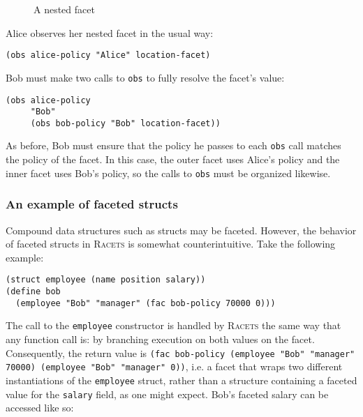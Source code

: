 \documentclass{article}
\begin{document}
\begin{figure}[h]
\begin{center}
	\caption{A nested facet}
	\label{figure:nested}
\end{center}
\end{figure}

Alice observes her nested facet in the usual way:

\begin{lstlisting}
(obs alice-policy "Alice" location-facet)
\end{lstlisting}

Bob must make two calls to \texttt{obs} to fully resolve the facet's value:

\begin{lstlisting}
(obs alice-policy
     "Bob"
     (obs bob-policy "Bob" location-facet))
\end{lstlisting}

As before, Bob must ensure that the policy he passes to each \texttt{obs} call matches the policy of the facet. In this case, the outer facet uses Alice's policy and the inner facet uses Bob's policy, so the calls to \texttt{obs} must be organized likewise.


\subsubsection{An example of faceted structs}
Compound data structures such as structs may be faceted. However, the behavior of faceted structs in \textsc{Racets} is somewhat counterintuitive. Take the following example:

\begin{lstlisting}
(struct employee (name position salary))
(define bob
  (employee "Bob" "manager" (fac bob-policy 70000 0)))
\end{lstlisting}

The call to the \texttt{employee} constructor is handled by \textsc{Racets} the same way that any function call is: by branching execution on both values on the facet. Consequently, the return value is \texttt{(fac bob-policy (employee "Bob" "manager" 70000) (employee "Bob" "manager" 0))}, i.e. a facet that wraps two different instantiations of the \texttt{employee} struct, rather than a structure containing a faceted value for the \texttt{salary} field, as one might expect. Bob's faceted salary can be accessed like so:
\end{document}
